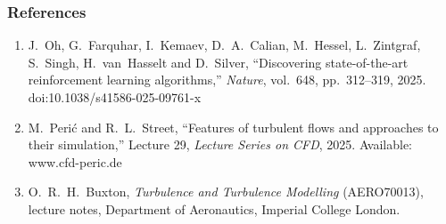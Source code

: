
\begin{frame}
	\frametitle{References}

	\footnotesize
	\begin{enumerate}
		\item[{[1]}] J.~Oh, G.~Farquhar, I.~Kemaev, D.~A.~Calian, M.~Hessel, L.~Zintgraf, S.~Singh, H.~van~Hasselt and D.~Silver, ``Discovering state-of-the-art reinforcement learning algorithms,'' \emph{Nature}, vol.~648, pp.~312--319, 2025. doi:10.1038/s41586-025-09761-x
        \item[{[2]}] M.~Peri\'c and R.~L.~Street, ``Features of turbulent flows and approaches to their simulation,'' Lecture 29, \emph{Lecture Series on CFD}, 2025. Available: www.cfd-peric.de
		\item[{[3]}] O.~R.~H.~Buxton, \emph{Turbulence and Turbulence Modelling} (AERO70013), lecture notes, Department of Aeronautics, Imperial College London.
	\end{enumerate}
\end{frame}
